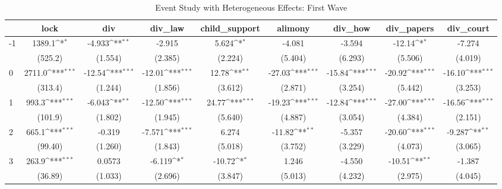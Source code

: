 \documentclass{article}
\begin{document}
{
\def\sym#1{\ifmmode^{#1}\else\(^{#1}\)\fi}
\begin{longtable}{l*{8}{c}}
\caption{Event Study with Heterogeneous Effects: First Wave}\\
\hline\hline\endfirsthead\hline\endhead\hline\endfoot\endlastfoot
                &\multicolumn{1}{c}{lock}&\multicolumn{1}{c}{div}&\multicolumn{1}{c}{div\_law}&\multicolumn{1}{c}{child\_support}&\multicolumn{1}{c}{alimony}&\multicolumn{1}{c}{div\_how}&\multicolumn{1}{c}{div\_papers}&\multicolumn{1}{c}{div\_court}\\
\hline
-1              &   1389.1\sym{*}  &   -4.933\sym{**} &   -2.915         &    5.624\sym{*}  &   -4.081         &   -3.594         &   -12.14\sym{*}  &   -7.274         \\
                &  (525.2)         &  (1.554)         &  (2.385)         &  (2.224)         &  (5.404)         &  (6.293)         &  (5.506)         &  (4.019)         \\
0               &   2711.0\sym{***}&   -12.54\sym{***}&   -12.01\sym{***}&    12.78\sym{**} &   -27.03\sym{***}&   -15.84\sym{***}&   -20.92\sym{***}&   -16.10\sym{***}\\
                &  (313.4)         &  (1.244)         &  (1.856)         &  (3.612)         &  (2.871)         &  (3.254)         &  (5.442)         &  (3.253)         \\
1               &    993.3\sym{***}&   -6.043\sym{**} &   -12.50\sym{***}&    24.77\sym{***}&   -19.23\sym{***}&   -12.84\sym{***}&   -27.00\sym{***}&   -16.56\sym{***}\\
                &  (101.9)         &  (1.802)         &  (1.945)         &  (5.640)         &  (4.887)         &  (3.054)         &  (4.384)         &  (2.151)         \\
2               &    665.1\sym{***}&   -0.319         &   -7.571\sym{***}&    6.274         &   -11.82\sym{**} &   -5.357         &   -20.60\sym{***}&   -9.287\sym{**} \\
                &  (99.40)         &  (1.260)         &  (1.843)         &  (5.018)         &  (3.752)         &  (3.229)         &  (4.073)         &  (3.065)         \\
3               &    263.9\sym{***}&   0.0573         &   -6.119\sym{*}  &   -10.72\sym{*}  &    1.246         &   -4.550         &   -10.51\sym{**} &   -1.387         \\
                &  (36.89)         &  (1.033)         &  (2.696)         &  (3.847)         &  (5.013)         &  (4.232)         &  (2.975)         &  (4.045)         \\

\end{longtable}}
\end{document}

